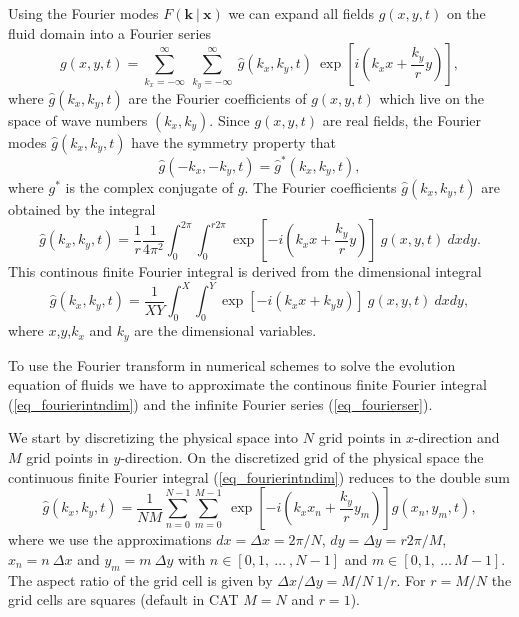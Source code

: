 Using the Fourier modes $F(\mathbf{k} \ | \ \mathbf{x})$ we can expand all 
fields $g(x,y,t)$ on the fluid domain into a Fourier series
\begin{equation} \label{eq_fourierser}
  g(x,y,t) 
   =  
  \sum_{k_{x} = -\infty}^{\infty} \ \sum_{k_{y} = -\infty}^{\infty} \ 
   \hat{g}(k_{x},k_{y},t) \ 
   \exp
   \left[ 
     i \left(k_{x} x + \frac{k_{y}}{r} y \right)
   \right],
\end{equation}
where $\hat{g}(k_{x},k_{y},t)$ are the Fourier coefficients of 
$g(x,y,t)$ which live on the space of wave numbers $(k_{x},k_{y})$.
Since $g(x,y,t)$ are real fields, the Fourier modes $\hat{g}(k_{x},k_{y},t)$
have the symmetry property that
\begin{equation} \label{eq_symfourier}
  \hat{g}(-k_{x},-k_{y},t)  = \hat{g}^{\ast}(k_{x},k_{y},t),
\end{equation}
where $g^{\ast}$ is the complex conjugate of $g$. The Fourier
coefficients $\hat{g}(k_{x},k_{y},t)$ are obtained by the integral
\begin{equation} \label{eq_fourierintndim}
  \hat{g}(k_{x},k_{y},t)
   = 
  \frac{1}{r} \frac{1}{4 \pi^{2}} 
   \int_{0}^{2 \pi} \int_{0}^{r 2 \pi}
   \exp  
   \left[ 
    -i \left(k_{x} x + \frac{k_{y}}{r} y \right)
   \right] \
   g(x,y,t) \ 
dx dy.
\end{equation}
This continous finite Fourier integral is derived from the
dimensional integral 
\begin{equation} \label{eq_fourierint}
  \hat{g}(k_{x},k_{y},t)
   =
  \frac{1}{XY} \int_{0}^{X} \int_{0}^{Y}
   \exp
   \left[
    -i \left(k_{x} x + k_{y} y \right)
   \right] \
   g(x,y,t) \
dx dy,
\end{equation}
where $x$,$y$,$k_{x}$ and $k_{y}$ are the dimensional variables.

To use the Fourier transform in numerical schemes to solve the evolution
equation of fluids we have to approximate the continous finite Fourier integral
(\ref{eq_fourierintndim}) and the infinite Fourier series
(\ref{eq_fourierser}).

We start by discretizing the physical space into $N$ grid points in
$x$-direction and $M$ grid points in $y$-direction. On the discretized
grid of the physical space the continuous finite Fourier integral
(\ref{eq_fourierintndim}) reduces to the double sum
\begin{equation} \label{eq_fourierintprox}
   \hat{g}(k_{x},k_{y},t)
    = 
   \frac{1}{N M} 
   \sum_{n = 0}^{N-1} \sum_{m=0}^{M-1} \
    \exp 
     \left[-i    
      \left(
       k_{x} x_{n} + \frac{k_{y}}{r} y_{m}
      \right)
     \right]
     g(x_{n},y_{m},t),
\end{equation}
where we use the approximations $dx = \Delta x =2\pi/N$, 
$dy = \Delta y = r 2\pi/M $, $x_{n} = n \ \Delta x$ 
and $y_{m} = m \ \Delta y$ with $n \in [0,1,\ \dots \ ,N-1]$ and
$m \in [0,1,\ \dots \,M-1]$. The aspect ratio of the grid cell 
is given by $\Delta x/\Delta y = M/N \ 1/r$. For $r = M/N$ 
the grid cells are squares (default in CAT $M=N$ and $r=1$).
 
